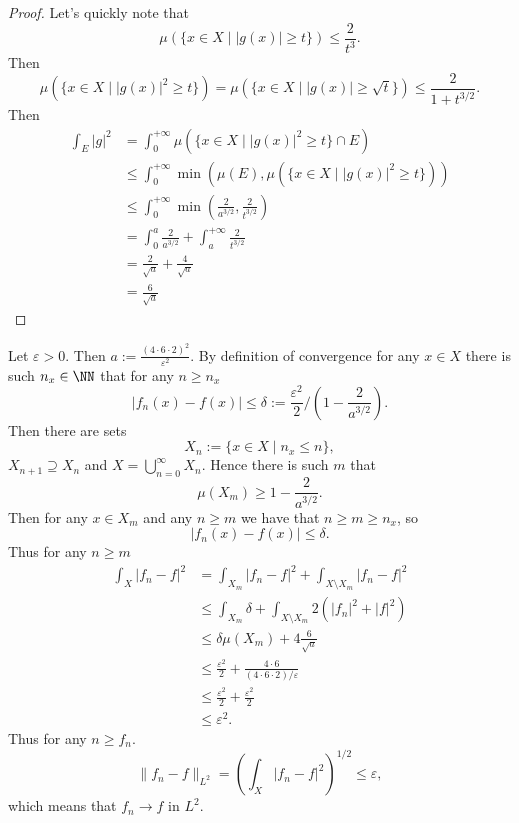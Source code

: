 \documentclass[12pt,a4paper]{article}
\begin{document}
\begin{enumproblem}
        \begin{proof}
            Let's quickly note that
            \[\mu(\{x \in X \mid |g(x)| \geqslant t\}) \leqslant \frac{2}{t^3}.\]
            Then
            \[\mu(\{x \in X \mid |g(x)|^2 \geqslant t\}) = \mu(\{x \in X \mid |g(x)| \geqslant \sqrt{t}\}) \leqslant \frac{2}{1 + t^{3/2}}.\]
            Then
            \begin{align*}
                \int_E |g|^2
                &= \int_0^{+\infty} \mu(\{x \in X \mid |g(x)|^2 \geqslant t\} \cap E)\\
                &\leqslant \int_0^{+\infty} \min(\mu(E), \mu(\{x \in X \mid |g(x)|^2 \geqslant t\}))\\
                &\leqslant \int_0^{+\infty} \min\left(\frac{2}{a^{3/2}}, \frac{2}{t^{3/2}}\right)\\
                &= \int_0^a \frac{2}{a^{3/2}} + \int_a^{+\infty} \frac{2}{t^{3/2}}\\
                &= \frac{2}{\sqrt{a}} + \frac{4}{\sqrt{a}}\\
                &= \frac{6}{\sqrt{a}}
            \end{align*}
        \end{proof}

        Let $\varepsilon > 0$. Then $a := \frac{(4 \cdot 6 \cdot 2)^2}{\varepsilon^2}$. By definition of convergence for any $x \in X$ there is such $n_x \in \NN$ that for any $n \geqslant n_x$
        \[|f_n(x) - f(x)| \leqslant \delta := \frac{\varepsilon^2}{2} / \left(1 - \frac{2}{a^{3/2}}\right).\]
        Then there are sets
        \[X_n := \{x \in X \mid n_x \leqslant n\},\]
        $X_{n+1} \supseteq X_n$ and $X = \bigcup_{n = 0}^{\infty} X_n$. Hence there is such $m$ that
        \[\mu(X_m) \geqslant 1 - \frac{2}{a^{3/2}}.\]
        Then for any $x \in X_m$ and any $n \geqslant m$ we have that $n \geqslant m \geqslant n_x$, so
        \[|f_n(x) - f(x)| \leqslant \delta.\]
        Thus for any $n \geqslant m$
        \begin{align*}
            \int_X |f_n - f|^2
            &= \int_{X_m} |f_n - f|^2 + \int_{X \setminus X_m} |f_n - f|^2\\
            &\leqslant \int_{X_m} \delta + \int_{X \setminus X_m} 2(|f_n|^2 + |f|^2)\\
            &\leqslant \delta \mu(X_m) + 4 \frac{6}{\sqrt{a}}\\
            &\leqslant \frac{\varepsilon^2}{2} + \frac{4 \cdot 6}{(4 \cdot 6 \cdot 2)/\varepsilon}\\
            &\leqslant \frac{\varepsilon^2}{2} + \frac{\varepsilon^2}{2}\\
            &\leqslant \varepsilon^2.
        \end{align*}
        Thus for any $n \geqslant f_n$.
        \[\|f_n - f\|_{L^2} = \left(\int_X |f_n - f|^2\right)^{1/2} \leqslant \varepsilon,\]
        which means that $f_n \to f$ in $L^2$.
    \end{enumproblem}
\end{document}

